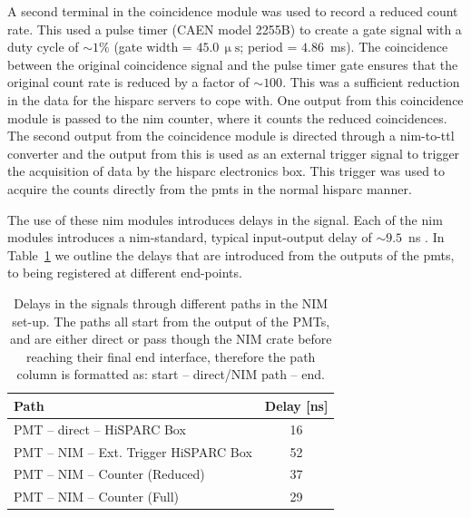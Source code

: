 A second terminal in the coincidence module was used to record a reduced count rate. This used a pulse timer (CAEN model 2255B) to create a gate signal with a duty cycle of $\sim 1\%$ (gate width = $45.0 \, \upmu\mathrm{s}$; period = $4.86$~ms). The coincidence between the original coincidence signal and the pulse timer gate ensures that the original count rate is reduced by a factor of $\sim 100$. This was a sufficient reduction in the data for the \gls{hisparc} servers to cope with. One output from this coincidence module is passed to the \gls{nim} counter, where it counts the reduced coincidences. The second output from the coincidence module is directed through a \gls{nim}-to-\gls{ttl} converter and the output from this is used as an external trigger signal to trigger the acquisition of data by the \gls{hisparc} electronics box. This trigger was used to acquire the counts directly from the \glspl{pmt} in the normal \gls{hisparc} manner.%

The use of these \gls{nim} modules introduces delays in the signal. Each of the \gls{nim} modules introduces a \gls{nim}-standard, typical input-output delay of $\sim 9.5$~ns \citep{lecroy_lecroy_1996, caen_technical_2011}. In Table~\ref{tab:HS_14008_delays} we outline the delays that are introduced from the outputs of the \glspl{pmt}, to being registered at different end-points.

\vspace{1em}

\begin{table}[ht!]
	\begin{center}
		\caption{Delays in the signals through different paths in the NIM set-up. The paths all start from the output of the PMTs, and are either direct or pass though the NIM crate before reaching their final end interface, therefore the path column is formatted as: start -- direct/NIM path -- end.}
		\label{tab:HS_14008_delays}
		\begin{tabular}{l c }
			\hline 
			{\bf Path} & {\bf Delay [ns]} \\ 
			\hline 
			PMT -- direct -- HiSPARC Box &  16 \\ 
			PMT -- NIM -- Ext. Trigger HiSPARC Box & 52 \\ 
			PMT -- NIM -- Counter (Reduced) & 37 \\ 
			PMT -- NIM -- Counter (Full) & 29 \\ 
			\hline 
		\end{tabular} 
	\end{center}
\end{table}

